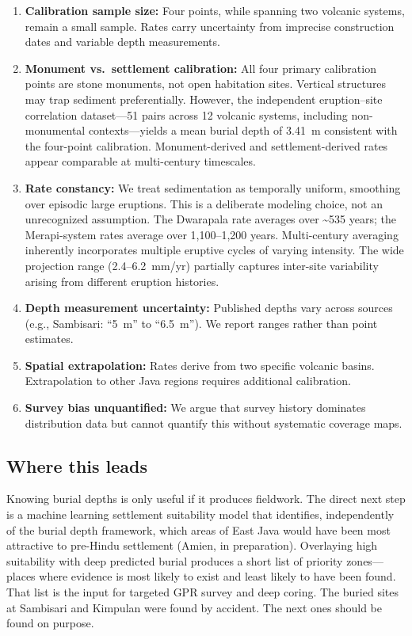 \documentclass[12pt,a4paper]{article}
\begin{document}
\begin{enumerate}
  \item \textbf{Calibration sample size:} Four points, while spanning two volcanic systems, remain a small sample. Rates carry uncertainty from imprecise construction dates and variable depth measurements.
  \item \textbf{Monument vs.~settlement calibration:} All four primary calibration points are stone monuments, not open habitation sites. Vertical structures may trap sediment preferentially. However, the independent eruption--site correlation dataset---51 pairs across 12 volcanic systems, including non-monumental contexts---yields a mean burial depth of 3.41~m consistent with the four-point calibration. Monument-derived and settlement-derived rates appear comparable at multi-century timescales.
  \item \textbf{Rate constancy:} We treat sedimentation as temporally uniform, smoothing over episodic large eruptions. This is a deliberate modeling choice, not an unrecognized assumption. The Dwarapala rate averages over \textasciitilde535 years; the Merapi-system rates average over 1,100--1,200 years. Multi-century averaging inherently incorporates multiple eruptive cycles of varying intensity. The wide projection range (2.4--6.2~mm/yr) partially captures inter-site variability arising from different eruption histories.
  \item \textbf{Depth measurement uncertainty:} Published depths vary across sources (e.g., Sambisari: ``5~m'' to ``6.5~m''). We report ranges rather than point estimates.
  \item \textbf{Spatial extrapolation:} Rates derive from two specific volcanic basins. Extrapolation to other Java regions requires additional calibration.
  \item \textbf{Survey bias unquantified:} We argue that survey history dominates distribution data but cannot quantify this without systematic coverage maps.
\end{enumerate}

\subsection{Where this leads}

Knowing burial depths is only useful if it produces fieldwork. The direct next step is a machine learning settlement suitability model that identifies, independently of the burial depth framework, which areas of East Java would have been most attractive to pre-Hindu settlement (Amien, in preparation). Overlaying high suitability with deep predicted burial produces a short list of priority zones---places where evidence is most likely to exist and least likely to have been found. That list is the input for targeted GPR survey and deep coring. The buried sites at Sambisari and Kimpulan were found by accident. The next ones should be found on purpose.
\end{document}
